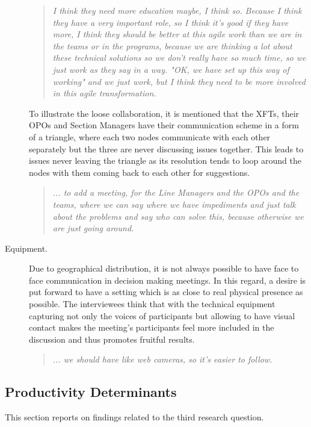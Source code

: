 \begin{description}
   \begin{quote}\itshape
   I think they need more education maybe, I think so. Because I think they have a very important role, so I think it’s good if they have more, I think they should be better at this agile work than we are in the teams or in the programs, because we are thinking a lot about these technical solutions so we don’t really have so much time, so we just work as they say in a way. "OK, we have set up this way of working" and we just work, but I think they need to be more involved in this agile transformation.
   \end{quote}
   
   To illustrate the loose collaboration, it is mentioned that the \acp{XFT}, their \acp{OPO} and Section Managers have their communication scheme in a form of a triangle, where each two nodes communicate with each other separately but the three are never discussing issues together. This leads to issues never leaving the triangle as its resolution tends to loop around the nodes with them coming back to each other for suggestions.

      \begin{quote}\itshape ... to add a meeting, for the Line Managers and the OPOs and the teams, where we can say where we have impediments and just talk about the problems and say who can solve this, because otherwise we are just going around.
      \end{quote}

   \item[Equipment.] Due to geographical distribution, it is not always possible to have face to face communication in decision making meetings. In this regard, a desire is put forward to have a setting which is as close to real physical presence as possible. The interviewees think that with the technical equipment capturing not only the voices of participants but allowing to have visual contact makes the meeting's participants feel more included in the discussion and thus promotes fruitful results.

      \begin{quote}\itshape ... we should have like web cameras, so it’s easier to follow.
      \end{quote}

\end{description}

\subsection{Productivity Determinants}  
This section reports on findings related to the third research question.

